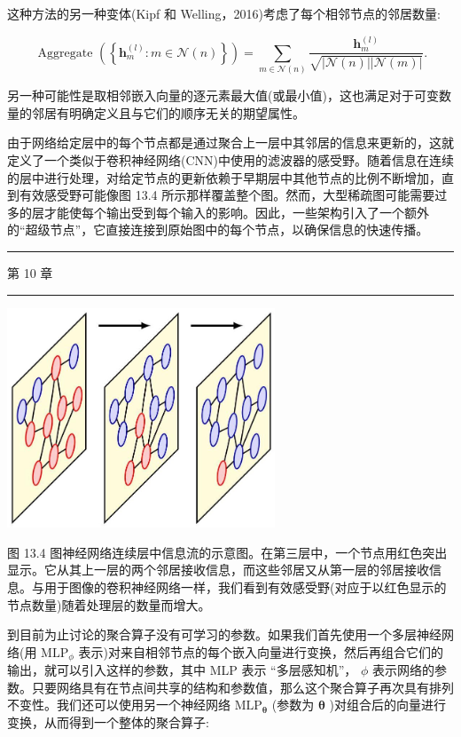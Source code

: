 \documentclass[10pt]{report}
\newcommand{\HRule}{\begin{center}\rule{0.9\linewidth}{0.2mm}\end{center}}
\begin{document}
这种方法的另一种变体(Kipf 和 Welling，2016)考虑了每个相邻节点的邻居数量:

\[
\text{ Aggregate }\left( \left\{  {{\mathbf{h}}_{m}^{\left( l\right) } : m \in  \mathcal{N}\left( n\right) }\right\}  \right)  = \mathop{\sum }\limits_{{m \in  \mathcal{N}\left( n\right) }}\frac{{\mathbf{h}}_{m}^{\left( l\right) }}{\sqrt{\left| {\mathcal{N}\left( n\right) }\right| \left| {\mathcal{N}\left( m\right) }\right| }}. \tag{13.14}
\]

另一种可能性是取相邻嵌入向量的逐元素最大值(或最小值)，这也满足对于可变数量的邻居有明确定义且与它们的顺序无关的期望属性。

由于网络给定层中的每个节点都是通过聚合上一层中其邻居的信息来更新的，这就定义了一个类似于卷积神经网络(CNN)中使用的滤波器的感受野。随着信息在连续的层中进行处理，对给定节点的更新依赖于早期层中其他节点的比例不断增加，直到有效感受野可能像图 13.4 所示那样覆盖整个图。然而，大型稀疏图可能需要过多的层才能使每个输出受到每个输入的影响。因此，一些架构引入了一个额外的“超级节点”，它直接连接到原始图中的每个节点，以确保信息的快速传播。

\HRule

第 10 章

\HRule

\begin{center}
\includegraphics[max width=0.6\textwidth]{images/0194e279-9b28-703a-88f4-c3ac21e2010d_436_809_343_747_612_0.jpg}
\end{center}
\hspace*{3em} 

图 13.4 图神经网络连续层中信息流的示意图。在第三层中，一个节点用红色突出显示。它从其上一层的两个邻居接收信息，而这些邻居又从第一层的邻居接收信息。与用于图像的卷积神经网络一样，我们看到有效感受野(对应于以红色显示的节点数量)随着处理层的数量而增大。

到目前为止讨论的聚合算子没有可学习的参数。如果我们首先使用一个多层神经网络(用 \({\mathrm{{MLP}}}_{\phi }\) 表示)对来自相邻节点的每个嵌入向量进行变换，然后再组合它们的输出，就可以引入这样的参数，其中 MLP 表示 “多层感知机”， \(\phi\) 表示网络的参数。只要网络具有在节点间共享的结构和参数值，那么这个聚合算子再次具有排列不变性。我们还可以使用另一个神经网络 \({\mathrm{{MLP}}}_{\mathbf{\theta }}\) (参数为 \(\mathbf{\theta }\) )对组合后的向量进行变换，从而得到一个整体的聚合算子:
\end{document}
